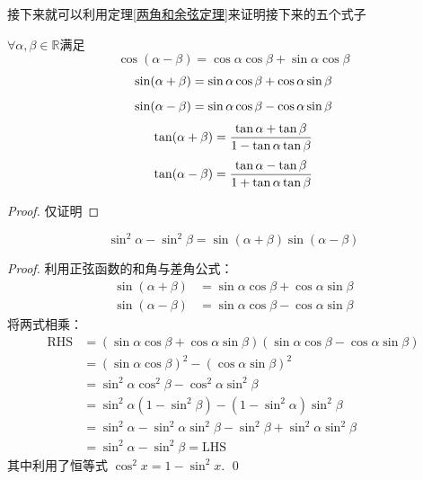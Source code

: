 接下来就可以利用定理\ref{两角和余弦定理}来证明接下来的五个式子
\begin{theorem}
    $\forall \alpha,\beta \in \mathbb{R} $满足
    \begin{equation}\label{两角差余弦}
        \cos(\alpha-\beta) = \cos \alpha\cos \beta +\sin \alpha\cos \beta  
    \end{equation}
    \begin{equation}\label{两角和正弦}
        \sin(\alpha+\beta)=\sin\alpha\cos\beta+\cos\alpha\sin\beta
    \end{equation}
    \begin{equation}\label{两角差正弦}
        \sin(\alpha-\beta)=\sin\alpha\cos\beta-\cos\alpha\sin\beta
    \end{equation}
    \begin{equation}\label{两角和正切}
        \tan(\alpha+\beta)=\frac{\tan\alpha+\tan\beta}{1-\tan\alpha\tan\beta}
    \end{equation}
    \begin{equation}\label{两角差正切}
        \tan(\alpha-\beta)=\frac{\tan\alpha-\tan\beta}{1+\tan\alpha\tan\beta}
    \end{equation}
\end{theorem}
\begin{proof}
仅证明
\end{proof}

\begin{theorem}[正弦平方差]
    \begin{equation}
         \sin^2\alpha - \sin^2\beta = \sin(\alpha+\beta)\sin(\alpha-\beta) 
    \end{equation}
\end{theorem}
\begin{proof}
    利用正弦函数的和角与差角公式：
\[
\begin{aligned}
\sin(\alpha+\beta) &= \sin\alpha\cos\beta + \cos\alpha\sin\beta \\
\sin(\alpha-\beta) &= \sin\alpha\cos\beta - \cos\alpha\sin\beta
\end{aligned}
\]
将两式相乘：
\[
\begin{aligned}
\mathrm{RHS} &= (\sin\alpha\cos\beta + \cos\alpha\sin\beta)(\sin\alpha\cos\beta - \cos\alpha\sin\beta) \\
&= (\sin\alpha\cos\beta)^2 - (\cos\alpha\sin\beta)^2 \\
&= \sin^2\alpha\cos^2\beta - \cos^2\alpha\sin^2\beta\\
&= \sin^2\alpha(1-\sin^2\beta) - (1-\sin^2\alpha)\sin^2\beta \\
&= \sin^2\alpha - \sin^2\alpha\sin^2\beta - \sin^2\beta + \sin^2\alpha\sin^2\beta \\
&= \sin^2\alpha - \sin^2\beta =\mathrm{LHS}
\end{aligned}
\]
其中利用了恒等式 $\cos^2 x = 1 - \sin^2 x$.
\qed
\end{proof}


